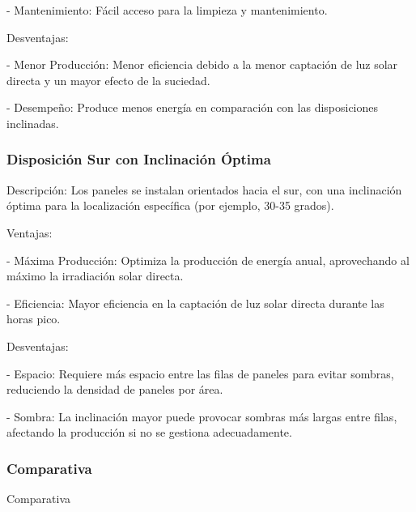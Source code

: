 \documentclass[a4paper,12pt]{article}
\begin{document}
\begin{Form}
- Mantenimiento: Fácil acceso para la limpieza y mantenimiento.

Desventajas:

- Menor Producción: Menor eficiencia debido a la menor captación de luz solar directa y un mayor efecto de la suciedad.

- Desempeño: Produce menos energía en comparación con las disposiciones inclinadas.

\subsubsection*{Disposición Sur con Inclinación Óptima}
Descripción:
Los paneles se instalan orientados hacia el sur, con una inclinación óptima para la localización específica (por ejemplo, 30-35 grados).


Ventajas:

- Máxima Producción: Optimiza la producción de energía anual, aprovechando al máximo la irradiación solar directa.

- Eficiencia: Mayor eficiencia en la captación de luz solar directa durante las horas pico.

Desventajas:

- Espacio: Requiere más espacio entre las filas de paneles para evitar sombras, reduciendo la densidad de paneles por área.

- Sombra: La inclinación mayor puede provocar sombras más largas entre filas, afectando la producción si no se gestiona adecuadamente.


\subsubsection*{Comparativa}

\datosNoNumericos



\begin{table}[ht]
    \centering
    \caption{Comparativa}
    \pgfplotstabletypeset[
        col sep=comma,
        every head row/.style={before row=\toprule, after row=\midrule},
        every last row/.style={after row=\bottomrule},
        string type %
    ]{\datosNoNumericos}
\end{table}




\end{Form}
\end{document}
